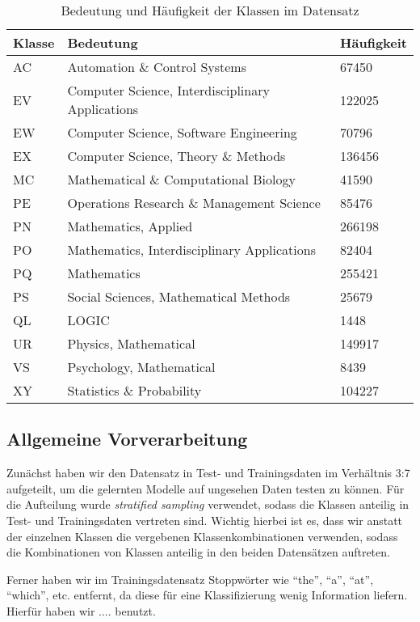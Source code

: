 \begin{table}[h]
    \centering
    \begin{tabular}{l|l|l}
        \textbf{Klasse} & \textbf{Bedeutung} & \textbf{Häufigkeit}\\
        \hline
        AC & Automation \& Control Systems & 67450\\
        EV & Computer Science, Interdisciplinary Applications & 122025\\
        EW & Computer Science, Software Engineering & 70796\\
        EX & Computer Science, Theory \& Methods & 136456\\
        MC & Mathematical \& Computational Biology & 41590\\
        PE & Operations Research \& Management Science & 85476\\
        PN & Mathematics, Applied & 266198\\
        PO & Mathematics, Interdisciplinary Applications & 82404\\
        PQ & Mathematics & 255421\\
        PS & Social Sciences, Mathematical Methods & 25679\\
        QL & LOGIC & 1448\\
        UR & Physics, Mathematical & 149917\\
        VS & Psychology, Mathematical & 8439\\
        XY & Statistics \& Probability & 104227\\
    \end{tabular}
    \caption{Bedeutung und Häufigkeit der Klassen im Datensatz}
    \label{tab:class_meaning}
\end{table}


\subsection{Allgemeine Vorverarbeitung}

Zunächst haben wir den Datensatz in Test- und Trainingsdaten im Verhältnis 3:7 aufgeteilt, um die gelernten Modelle auf ungesehen Daten testen zu können.
Für die Aufteilung wurde \emph{stratified sampling} verwendet, sodass die Klassen anteilig in Test- und Trainingsdaten vertreten sind.
Wichtig hierbei ist es, dass wir anstatt der einzelnen Klassen die vergebenen Klassenkombinationen verwenden, sodass die Kombinationen von Klassen anteilig in den beiden Datensätzen auftreten.

Ferner haben wir im Trainingsdatensatz Stoppwörter wie ``the'', ``a'', ``at'', ``which'', etc. entfernt, da diese für eine Klassifizierung wenig Information liefern.
Hierfür haben wir .... benutzt. %

